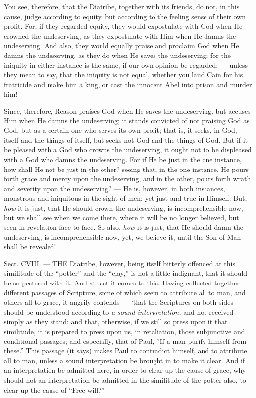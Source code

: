 You see, therefore, that the Diatribe, together with its friends, do not, in this cause, judge according to equity, but according to the feeling sense of their own profit. For, if they regarded equity, they would expostulate with God when He crowned the undeserving, as they expostulate with Him when He damns the undeserving. And also, they would equally praise and proclaim God when He damns the undeserving, as they do when He saves the undeserving; for the iniquity in either instance is the same, if our own opinion be regarded: — unless they mean to say, that the iniquity is not equal, whether you laud Cain for his fratricide and make him a king, or cast the innocent Abel into prison and murder him!

Since, therefore, Reason praises God when He saves the undeserving, but accuses Him when He damns the undeserving; it stands convicted of not praising God as God, but as a certain one who serves its own profit; that is, it seeks, in God, itself and the things of itself, but seeks not God and the things of God. But if it be pleased with a God who crowns the undeserving, it ought not to be displeased with a God who damns the undeserving. For if He be just in the one instance, how shall He not be just in the other? seeing that, in the one instance, He pours forth grace and mercy upon the undeserving, and in the other, pours forth wrath and severity upon the undeserving? — He is, however, in both instances, monstrous and iniquitous in the sight of men; yet just and true in Himself. But, \emph{how }it is just, that He should crown the undeserving, is incomprehensible now, but we shall see when we come there, where it will be no longer believed, but seen in revelation face to face. So also, \emph{how }it is just, that He should damn the undeserving, is incomprehensible now, yet, we believe it, until the Son of Man shall be revealed!


Sect. CVIII. — THE Diatribe, however, being itself bitterly offended at this similitude of the “potter” and the “clay,” is not a little indignant, that it should be so pestered with it. And at last it comes to this. Having collected together different passages of Scripture, some of which seem to attribute all to man, and others all to grace, it angrily contends — ‘that the Scriptures on both sides should be understood according to \emph{a sound interpretation, }and not received simply as they stand: and that, otherwise, if we still so press upon it that similitude, it is prepared to press upon us, in retaliation, those subjunctive and conditional passages; and especially, that of Paul, “If a man purify himself from these.” This passage (it says) makes Paul to contradict himself, and to attribute all to man, unless a sound interpretation be brought in to make it clear. And if an interpretation be admitted here, in order to clear up the cause of grace, why should not an interpretation be admitted in the similitude of the potter also, to clear up the cause of “Free-will?” —

